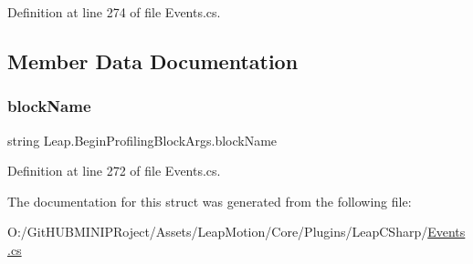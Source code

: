 Definition at line 274 of file Events.\+cs.



\subsection{Member Data Documentation}
\mbox{\label{struct_leap_1_1_begin_profiling_block_args_acd3d10091043d45a9071d62de179aac5}} 
\subsubsection{\texorpdfstring{blockName}{blockName}}
{\footnotesize\ttfamily string Leap.\+Begin\+Profiling\+Block\+Args.\+block\+Name}



Definition at line 272 of file Events.\+cs.



The documentation for this struct was generated from the following file\+:\begin{DoxyCompactItemize}
\item 
O\+:/\+Git\+H\+U\+B\+M\+I\+N\+I\+P\+Roject/\+Assets/\+Leap\+Motion/\+Core/\+Plugins/\+Leap\+C\+Sharp/\mbox{\hyperlink{_events_8cs}{Events.\+cs}}\end{DoxyCompactItemize}
